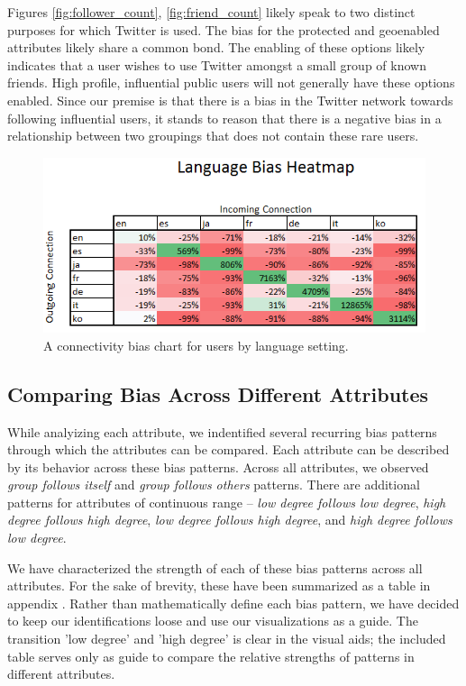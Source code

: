 Figures \ref{fig:follower_count}, \ref{fig:friend_count} likely speak to two distinct purposes for which Twitter is used.  The bias for the protected and geoenabled attributes likely share a common bond.  The enabling of these options likely indicates that a user wishes to use Twitter amongst a small group of known friends.  High profile, influential public users will not generally have these options enabled.  Since our premise is that there is a bias in the Twitter network towards following influential users, it stands to reason that there is a negative bias in a relationship between two groupings that does not contain these rare users.



\begin{figure}[t]
 \centering
 \includegraphics[bb=0 0 424 194, scale=.5]{./images/Bates-Final/lang.png}
 \caption{A connectivity bias chart for users by language setting.}
 \label{fig:lang}
\end{figure}

\subsection{Comparing Bias Across Different Attributes}
\label{sub:crossattribute}
While analyizing each attribute, we indentified several recurring bias patterns through which the attributes can be compared.  Each attribute can be described by its behavior across these bias patterns.  Across all attributes, we observed \textit{group follows itself} and \textit{group follows others} patterns.  There are additional patterns for attributes of continuous range -- \textit{low degree follows low degree}, \textit{high degree follows high degree}, \textit{low degree follows high degree}, and \textit{high degree follows low degree}.

We have characterized the strength of each of these bias patterns across all attributes.  For the sake of brevity, these have been summarized as a table in appendix \label{app:table_cross_attribute}.  Rather than mathematically define each bias pattern, we have decided to keep our identifications loose and use our visualizations as a guide.  The transition 'low degree' and 'high degree' is clear in the visual aids; the included table serves only as guide to compare the relative strengths of patterns in different attributes.
